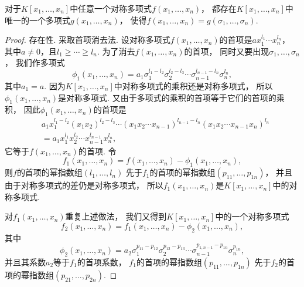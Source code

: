 \begin{theorem}[对称多项式基本定理]
对于\(K[x_1,\dotsc,x_n]\)中任意一个对称多项式\(f(x_1,\dotsc,x_n)\)，
都存在\(K[x_1,\dotsc,x_n]\)中唯一的一个多项式\(g(x_1,\dotsc,x_n)\)，
使得\(f(x_1,\dotsc,x_n)=g(\sigma_1,\dotsc,\sigma_n)\).
\begin{proof}
存在性.
采取首项消去法.
设对称多项式\(f(x_1,\dotsc,x_n)\)的首项是\(a x_1^{l_1} \dotsm x_n^{l_n}\)，
其中\(a\neq0\)，且\(l_1 \geq \dotsb \geq l_n\).
为了消去\(f(x_1,\dotsc,x_n)\)的首项，
同时又要出现\(\sigma_1,\dotsc,\sigma_n\)，
我们作多项式\begin{equation*}
	\phi_1(x_1,\dotsc,x_n)
	= a_1 \sigma_1^{l_1-l_2} \sigma_2^{l_2-l_3}
	\dotsm \sigma_{n-1}^{l_{n-1}-l_n} \sigma_n^{l_n},
\end{equation*}
其中\(a_1=a\).
因为\(K[x_1,\dotsc,x_n]\)中对称多项式的乘积还是对称多项式，
所以\(\phi_1(x_1,\dotsc,x_n)\)是对称多项式.
又由于多项式的乘积的首项等于它们的首项的乘积，
因此\(\phi_1(x_1,\dotsc,x_n)\)的首项是\begin{align*}
	&a_1 x_1^{l_1-l_2} (x_1 x_2)^{l_2-l_3}
	\dotsm (x_1 x_2 \dotsm x_{n-1})^{l_{n-1}-l_n}
	(x_1 x_2 \dotsm x_{n-1} x_n)^{l_n} \\
	&= a_1 x_1^{l_1} x_2^{l_2} \dotsm x_{n-1}^{l_{n-1}} x_n^{l_n},
\end{align*}
它等于\(f(x_1,\dotsc,x_n)\)的首项.
令\begin{equation*}
	f_1(x_1,\dotsc,x_n)
	=f(x_1,\dotsc,x_n)
	-\phi_1(x_1,\dotsc,x_n),
\end{equation*}
则\(f\)的首项的幂指数组\((l_1,\dotsc,l_n)\)
先于\(f_1\)的首项的幂指数组\((p_{11},\dotsc,p_{1n})\)，
并且由于对称多项式的差仍是对称多项式，
所以\(f_1(x_1,\dotsc,x_n)\)是\(K[x_1,\dotsc,x_n]\)中的对称多项式.

对\(f_1(x_1,\dotsc,x_n)\)重复上述做法，
我们又得到\(K[x_1,\dotsc,x_n]\)中的一个对称多项式\begin{equation*}
	f_2(x_1,\dotsc,x_n)
	=f_1(x_1,\dotsc,x_n)
	-\phi_2(x_1,\dotsc,x_n),
\end{equation*}
其中\begin{equation*}
	\phi_2(x_1,\dotsc,x_n)
	=a_2 \sigma_1^{p_{11}-p_{12}} \sigma_2^{p_{12}-p_{13}}
	\dotsm \sigma_{n-1}^{p_{1,n-1}-p_{1n}} \sigma_n^{p_{1n}},
\end{equation*}
并且其系数\(a_2\)等于\(f_1\)的首项系数，
\(f_1\)的首项的幂指数组\((p_{11},\dotsc,p_{1n})\)
先于\(f_2\)的首项的幂指数组\((p_{21},\dotsc,p_{2n})\).


\end{proof}
\end{theorem}

